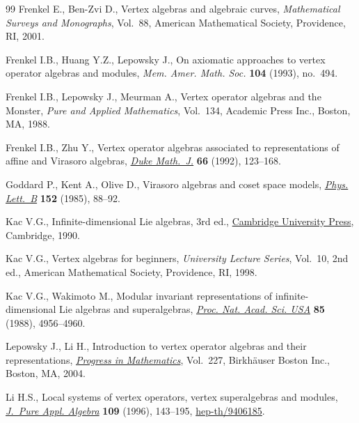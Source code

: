 \documentclass[11pt]{article}
\newcommand{\1}{\bf 1}
\begin{document}
\begin{thebibliography}{99}
Frenkel E., Ben-Zvi D., Vertex algebras and algebraic curves,
  \textit{Mathematical Surveys and Monographs}, Vol.~88, American Mathematical
  Society, Providence, RI, 2001.

Frenkel I.B., Huang Y.Z., Lepowsky J., On axiomatic approaches to vertex
  operator algebras and modules, \textit{Mem. Amer. Math. Soc.} \textbf{104}
  (1993), no.~494.

Frenkel I.B., Lepowsky J., Meurman A., Vertex operator algebras and the
  {M}onster, \textit{Pure and Applied Mathematics}, Vol.~134, Academic Press
  Inc., Boston, MA, 1988.


Frenkel I.B., Zhu Y., Vertex operator algebras associated to representations of
  af\/f\/ine and {V}irasoro algebras, \href{http://dx.doi.org/10.1215/S0012-7094-92-06604-X}{\textit{Duke Math.~J.}} \textbf{66} (1992),
  123--168.

Goddard P., Kent A., Olive D., Virasoro algebras and coset space models,
  \href{http://dx.doi.org/10.1016/0370-2693(85)91145-1}{\textit{Phys. Lett.~B}} \textbf{152} (1985), 88--92.

Kac V.G., Inf\/inite-dimensional {L}ie algebras, 3rd ed., \href{http://dx.doi.org/10.1017/CBO9780511626234}{Cambridge University
  Press}, Cambridge, 1990.

Kac V.G., Vertex algebras for beginners, \textit{University Lecture Series},
  Vol.~10, 2nd ed., American Mathematical Society, Providence, RI, 1998.


Kac V.G., Wakimoto M., Modular invariant representations of
  inf\/inite-dimensional {L}ie algebras and superalgebras, \href{http://dx.doi.org/10.1073/pnas.85.14.4956}{\textit{Proc. Nat.
  Acad. Sci. USA}} \textbf{85} (1988), 4956--4960.

Lepowsky J., Li H., Introduction to vertex operator algebras and their
  representations, \href{http://dx.doi.org/10.1007/978-0-8176-8186-9}{\textit{Progress in Mathematics}}, Vol.~227, Birkh\"auser
  Boston Inc., Boston, MA, 2004.

Li H.S., Local systems of vertex operators, vertex superalgebras and modules,
  \href{http://dx.doi.org/10.1016/0022-4049(95)00079-8}{\textit{J.~Pure Appl. Algebra}} \textbf{109} (1996), 143--195,
  \href{http://arxiv.org/abs/hep-th/9406185}{hep-th/9406185}.

\end{thebibliography}
\end{document}
